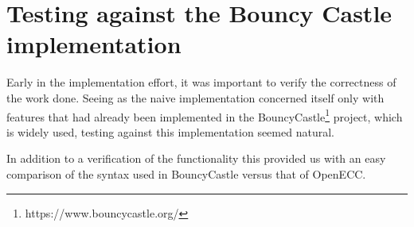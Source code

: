 \section{Testing against the Bouncy Castle implementation}

Early in the implementation effort, it was important to verify the correctness of the work done. Seeing
as the naive implementation concerned itself only with features that had already been implemented in
the BouncyCastle\footnote{https://www.bouncycastle.org/} project, which is widely used, testing against
this implementation seemed natural.

In addition to a verification of the functionality this provided us with an easy comparison of the syntax
used in BouncyCastle versus that of OpenECC.